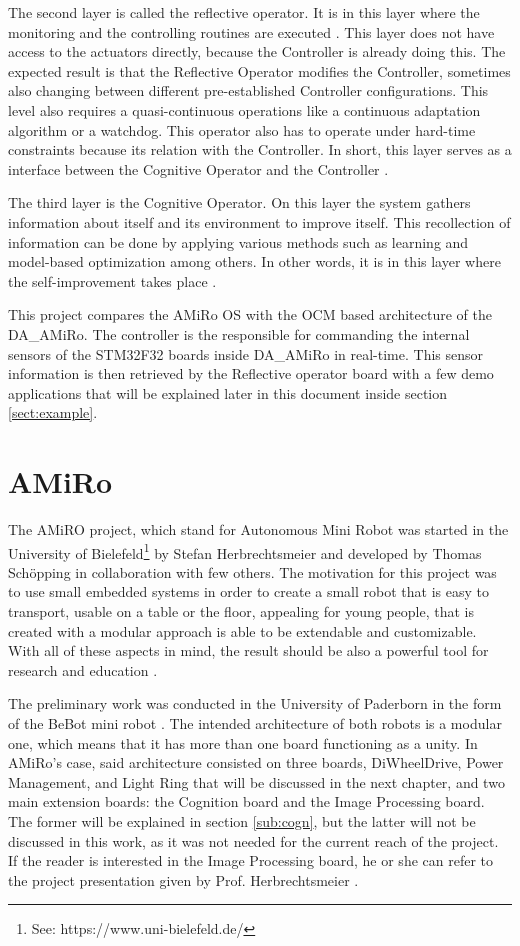 \documentclass[12pt]{report}%
\begin{document}
The second layer is called the reflective operator. It is in this layer where the monitoring and the controlling routines are executed \cite{ocmAuto}. This layer does not have access to the actuators directly, because the Controller is already doing this. The expected result is that the Reflective Operator modifies the Controller, sometimes also changing between different pre-established Controller configurations. This level also requires a quasi-continuous operations like a continuous adaptation algorithm or a watchdog. This operator also has to operate under hard-time constraints because its relation with the Controller. In short, this layer serves as a interface between the Cognitive Operator and the Controller \cite{ocmAuto}.

The third layer is the Cognitive Operator. On this layer the system gathers information about itself and its environment to improve itself. This recollection of information can be done by applying various methods such as learning and model-based optimization among others. In other words, it is in this layer where the self-improvement takes place \cite{ocmAuto}.

This project compares the AMiRo OS with the OCM based architecture of the DA\_AMiRo. The controller is the responsible for commanding the internal sensors of the STM32F32 boards inside DA\_AMiRo in real-time. This sensor information is then retrieved by the Reflective operator board with a few demo applications that will be explained later in this document inside section \ref{sect:example}.

\section{AMiRo}
The AMiRO project, which stand for Autonomous Mini Robot was started in the University of Bielefeld\footnote{See: https://www.uni-bielefeld.de/} by Stefan Herbrechtsmeier and developed by Thomas Schöpping in collaboration with few others. The motivation for this project was to use small embedded systems in order to create a small robot that is easy to transport, usable on a table or the floor, appealing for young people, that is created with a modular approach is able to be extendable and customizable. With all of these aspects in mind, the result should be also a powerful tool for research and education \cite{AMiRo_ppt_v1}.

The preliminary work was conducted in the University of Paderborn in the form of the BeBot mini robot \cite{AMiRo_ppt_v1}. The intended architecture of both robots is a modular one, which means that it has more than one board functioning as a unity. In AMiRo's case, said architecture consisted on three boards, DiWheelDrive, Power Management, and Light Ring that will be discussed in the next chapter, and two main extension boards: the Cognition board and the Image Processing board. The former will be explained in section \ref{sub:cogn}, but the latter will not be discussed in this work, as it was not needed for the current reach of the project. If the reader is interested in the Image Processing board, he or she can refer to the project presentation given by Prof. Herbrechtsmeier \cite{AMiRo_ppt_v2}.
\end{document}
